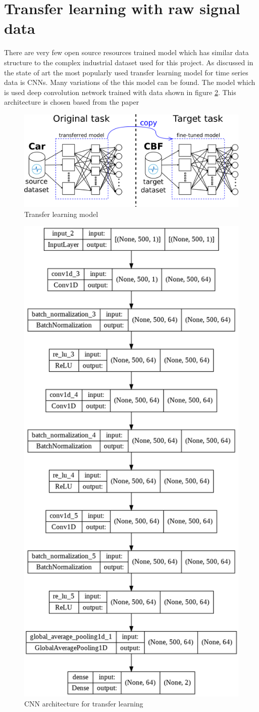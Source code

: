    \section{Transfer learning with raw signal data}
There are very few open source resources trained model which has similar data structure to the complex industrial dataset used for this project. As discussed in the state of art the most popularly used transfer learning model for time series data is CNNs. Many variations of the this model can be found. The model which is used deep convolution network trained with data shown in figure \ref{ne1}. This architecture is chosen based from the paper \cite{fawaz2018transfer}

  \begin{figure}[h]
  	\centering
  	\includegraphics[width=0.9\linewidth]{images/transferss.png}
  	\caption{Transfer learning model \cite{oh2018residual} }
  	\label{n01}
  \end{figure}
   
   \begin{figure}[h]
     	\centering
     	\includegraphics[width=0.49\linewidth]{images/cnna.png}
     	\caption{CNN architecture for transfer learning }
     	\label{ne1}
     \end{figure}
     
